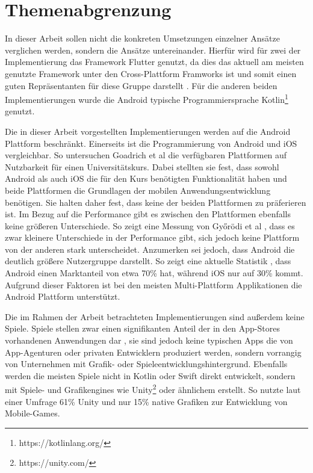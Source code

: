 \section{Themenabgrenzung}
\label{cha:3_3abgrenzung}
In dieser Arbeit sollen nicht die konkreten Umsetzungen einzelner Ansätze verglichen werden, sondern die Ansätze untereinander. Hierfür wird für zwei der Implementierung das Framework Flutter genutzt, da dies das aktuell am meisten genutzte Framework unter den Cross-Plattform Framworks ist und somit einen guten Repräsentanten für diese Gruppe darstellt \cite{statist_CP_Framework}. Für die anderen beiden Implementierungen wurde die Android typische Programmiersprache Kotlin\footnote{https://kotlinlang.org/} genutzt. 

Die in dieser Arbeit vorgestellten Implementierungen werden auf die Android Plattform beschränkt. 
Einerseits ist die Programmierung von Android und iOS vergleichbar.
So untersuchen Goadrich et al \cite{iOSvsAndroid} die verfügbaren Plattformen auf Nutzbarkeit für einen Universitätskurs. 
Dabei stellten sie  fest, dass sowohl Android als auch iOS die für den Kurs benötigten Funktionalität haben und beide Plattformen die Grundlagen der mobilen Anwendungsentwicklung benötigen. Sie halten daher fest, dass keine der beiden Plattformen zu präferieren ist.
Im Bezug auf die Performance gibt es zwischen den Plattformen ebenfalls keine größeren Unterschiede. So zeigt eine Messung von Győrödi et al \cite{Android_IOS_Performance_comparison}, dass es zwar kleinere Unterschiede in der Performance gibt, sich jedoch keine Plattform von der anderen stark unterscheidet.
Anzumerken sei jedoch, dass Android die deutlich größere Nutzergruppe darstellt. So zeigt eine aktuelle Statistik \cite{statist_OS_worldwide}, dass Android einen Marktanteil von etwa 70\% hat, während iOS nur auf 30\% kommt. Aufgrund dieser Faktoren ist bei den meisten Multi-Plattform Applikationen die Android Plattform unterstützt.

Die im Rahmen der Arbeit betrachteten Implementierungen sind außerdem keine Spiele. Spiele stellen zwar einen signifikanten Anteil der in den App-Stores vorhandenen Anwendungen dar \cite{statist_games_appstore}, sie sind jedoch keine typischen Apps die von App-Agenturen oder privaten Entwicklern produziert werden, sondern vorrangig von Unternehmen mit Grafik- oder Spieleentwicklungshintergrund. Ebenfalls werden die meisten Spiele nicht in Kotlin oder Swift direkt entwickelt, sondern mit Spiele- und Grafikengines wie Unity\footnote{https://unity.com/} oder ähnlichem erstellt. So nutzte laut einer Umfrage \cite{unity_percantage_game_enginge} 61\% Unity und nur 15\% native Grafiken zur Entwicklung von Mobile-Games.

